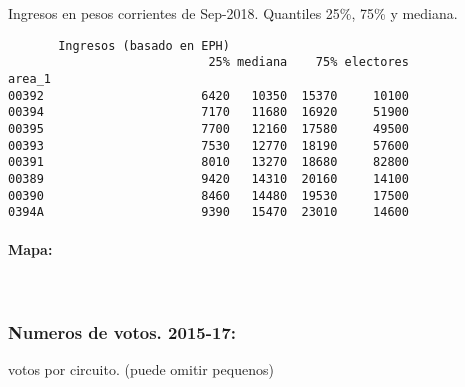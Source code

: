 \documentclass[11pt]{article}
\begin{document}
    
    Ingresos en pesos corrientes de Sep-2018. Quantiles 25\%, 75\% y
mediana.

    
    
    \begin{verbatim}
       Ingresos (basado en EPH)                         
                            25% mediana    75% electores
area_1                                                  
00392                      6420   10350  15370     10100
00394                      7170   11680  16920     51900
00395                      7700   12160  17580     49500
00393                      7530   12770  18190     57600
00391                      8010   13270  18680     82800
00389                      9420   14310  20160     14100
00390                      8460   14480  19530     17500
0394A                      9390   15470  23010     14600
    \end{verbatim}

    
    \hypertarget{mapa}{%
\paragraph{Mapa:}\label{mapa}}

    
    \begin{center}
    \end{center}
    { \hspace*{\fill} \\}
    
    \hypertarget{numeros-de-votos.-2015-17}{%
\subsubsection{Numeros de votos.
2015-17:}\label{numeros-de-votos.-2015-17}}

    
    votos por circuito. (puede omitir pequenos)

    
    
\end{document}

